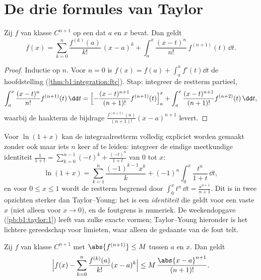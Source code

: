 \section{De drie formules van Taylor}

\begin{theorem}\label{thm:b1:taylor:integral}
Zij $f$ van klasse $C^{n+1}$ op een  dat $a$ en $x$ bevat.
Dan geldt
\[
f(x) = \sum_{k=0}^{n} \frac{f^{(k)}(a)}{k!}\,(x - a)^k
+ \int_a^x \frac{(x - t)^n}{n!}\, f^{(n+1)}(t)\, \dd t .
\]
\end{theorem}

\begin{proof}
Inductie op $n$. Voor $n = 0$ is $f(x) = f(a) + \int_a^x f'(t)\dd t$
de hoofdstelling (\cref{thm:b1:integration:ftc}). Stap: integreer de
restterm partieel,
\[
\int_a^x \frac{(x-t)^n}{n!} f^{(n+1)}(t)\,\dd t
= \Bigl[-\frac{(x-t)^{n+1}}{(n+1)!} f^{(n+1)}(t)\Bigr]_a^x
+ \int_a^x \frac{(x-t)^{n+1}}{(n+1)!} f^{(n+2)}(t)\,\dd t ,
\]
waarbij de haakterm de bijdrage $\frac{f^{(n+1)}(a)}{(n+1)!}(x -
a)^{n+1}$ levert.
\end{proof}

\begin{example}\label{ex:b1:taylor:lnexact}
Voor $\ln(1 + x)$ kan de integraalrestterm volledig expliciet
worden gemaakt zonder ook maar iets $n$ keer af te leiden:
integreer de eindige meetkundige identiteit $\frac{1}{1+t} =
\sum_{k=0}^{n-1}(-t)^k + \frac{(-t)^n}{1+t}$ van $0$ tot $x$:
\[
\ln(1 + x) = \sum_{k=1}^{n} \frac{(-1)^{k-1}x^k}{k}
+ (-1)^n \int_0^x \frac{t^n}{1 + t}\,\dd t ,
\]
en voor $0 \leq x \leq 1$ wordt de restterm begrensd door $\int_0^x
t^n\,\dd t = \frac{x^{n+1}}{n+1}$. Dit is in twee opzichten
sterker dan Taylor--Young: het is een \emph{identiteit} die geldt
voor een vaste $x$ (niet alleen voor $x \to 0$), en de foutgrens
is numeriek. De weekendopgave (\cref{pb:b1:taylor:1}) leeft van
zulke exacte vormen; Taylor--Young hieronder is het lichtere
gereedschap voor limieten, waar alleen de gedaante van de fout
telt.
\end{example}

\begin{theorem}\label{thm:b1:taylor:lagrange}
Zij $f$ van klasse $C^{n+1}$ met $\abs{f^{(n+1)}} \leq M$ tussen $a$
en $x$. Dan geldt
\[
\Bigl| f(x) - \sum_{k=0}^{n} \frac{f^{(k)}(a)}{k!}(x-a)^k \Bigr|
\leq M\, \frac{\abs{x - a}^{n+1}}{(n+1)!} .
\]
\end{theorem}

